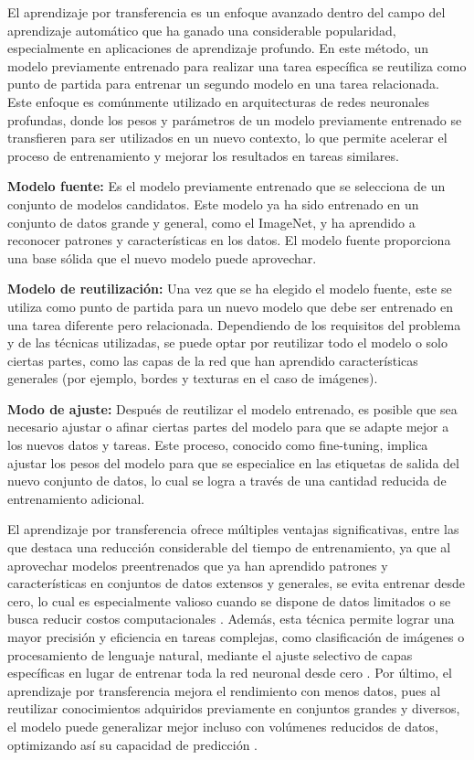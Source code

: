 El aprendizaje por transferencia es un enfoque avanzado dentro del campo del aprendizaje
automático que ha ganado una considerable popularidad, especialmente en aplicaciones de
aprendizaje profundo. En este método, un modelo previamente entrenado para realizar una
tarea específica se reutiliza como punto de partida para entrenar un segundo modelo en una
tarea relacionada. Este enfoque es comúnmente utilizado en arquitecturas de redes
neuronales profundas, donde los pesos y parámetros de un modelo previamente entrenado se
transfieren para ser utilizados en un nuevo contexto, lo que permite acelerar el proceso
de entrenamiento y mejorar los resultados en tareas similares.

\textbf{Modelo fuente:} Es el modelo previamente entrenado que se selecciona de un
conjunto de modelos candidatos. Este modelo ya ha sido entrenado en un conjunto de datos
grande y general, como el ImageNet, y ha aprendido a reconocer patrones y características
en los datos. El modelo fuente proporciona una base sólida que el nuevo modelo puede
aprovechar.

\textbf{Modelo de reutilización:} Una vez que se ha elegido el modelo fuente, este se
utiliza como punto de partida para un nuevo modelo que debe ser entrenado en una tarea
diferente pero relacionada. Dependiendo de los requisitos del problema y de las técnicas
utilizadas, se puede optar por reutilizar todo el modelo o solo ciertas partes, como las
capas de la red que han aprendido características generales (por ejemplo, bordes y
texturas en el caso de imágenes).

\textbf{Modo de ajuste:} Después de reutilizar el modelo entrenado, es posible que sea
necesario ajustar o afinar ciertas partes del modelo para que se adapte mejor a los nuevos
datos y tareas. Este proceso, conocido como fine-tuning, implica ajustar los pesos del
modelo para que se especialice en las etiquetas de salida del nuevo conjunto de datos, lo
cual se logra a través de una cantidad reducida de entrenamiento adicional.

El aprendizaje por transferencia ofrece múltiples ventajas significativas, entre las que
destaca una reducción considerable del tiempo de entrenamiento, ya que al aprovechar
modelos preentrenados que ya han aprendido patrones y características en conjuntos de
datos extensos y generales, se evita entrenar desde cero, lo cual es especialmente valioso
cuando se dispone de datos limitados o se busca reducir costos computacionales
. Además, esta técnica permite lograr una mayor precisión y
eficiencia en tareas complejas, como clasificación de imágenes o procesamiento de lenguaje
natural, mediante el ajuste selectivo de capas específicas en lugar de entrenar toda la
red neuronal desde cero . Por último, el aprendizaje
por transferencia mejora el rendimiento con menos datos, pues al reutilizar conocimientos
adquiridos previamente en conjuntos grandes y diversos, el modelo puede generalizar mejor
incluso con volúmenes reducidos de datos, optimizando así su capacidad de predicción
.

